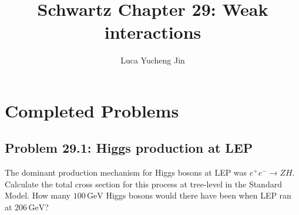 \documentclass[a4paper,11pt]{article}
\title{Schwartz Chapter 29: Weak interactions}
\author{Luca Yucheng Jin}
\begin{document}
\maketitle

\section{Completed Problems}

\subsection[Problem 29.1: Higgs production at LEP]{Problem 29.1: Higgs production at LEP}

The dominant production mechanism for Higgs bosons at LEP was
$e^+e^-\to ZH$. Calculate the total cross section for this process at
tree-level in the Standard Model. How many $100\,\mathrm{GeV}$ Higgs bosons
would there have been when LEP ran at $206\,\mathrm{GeV}$?
\end{document}
